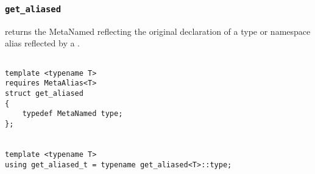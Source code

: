 
\subsubsection{\texttt{get\_aliased}}

returns the MetaNamed reflecting the original declaration of a type or namespace alias reflected by a .

\begin{verbatim}

template <typename T>
requires MetaAlias<T>
struct get_aliased
{
	typedef MetaNamed type;
};


template <typename T>
using get_aliased_t = typename get_aliased<T>::type;

\end{verbatim}
